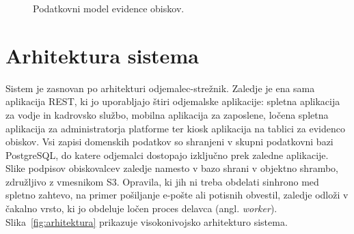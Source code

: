 \begin{figure}[htbp]
\centering
{}
\caption{Podatkovni model evidence obiskov.}
\label{fig:er-obiski}
\end{figure}
\FloatBarrier

\section{Arhitektura sistema}
\label{sec:arhitektura}

Sistem je zasnovan po arhitekturi odjemalec-strežnik. Zaledje je ena sama aplikacija REST, ki jo uporabljajo štiri odjemalske aplikacije: spletna aplikacija za vodje in kadrovsko službo, mobilna aplikacija za zaposlene, ločena spletna aplikacija za administratorja platforme ter kiosk aplikacija na tablici za evidenco obiskov. Vsi zapisi domenskih podatkov so shranjeni v skupni podatkovni bazi PostgreSQL, do katere odjemalci dostopajo izključno prek zaledne aplikacije. Slike podpisov obiskovalcev zaledje namesto v bazo shrani v objektno shrambo, združljivo z vmesnikom S3. Opravila, ki jih ni treba obdelati sinhrono med spletno zahtevo, na primer pošiljanje e-pošte ali potisnih obvestil, zaledje odloži v čakalno vrsto, ki jo obdeluje ločen proces delavca (angl. \textit{worker}). Slika~\ref{fig:arhitektura} prikazuje visokonivojsko arhitekturo sistema.

